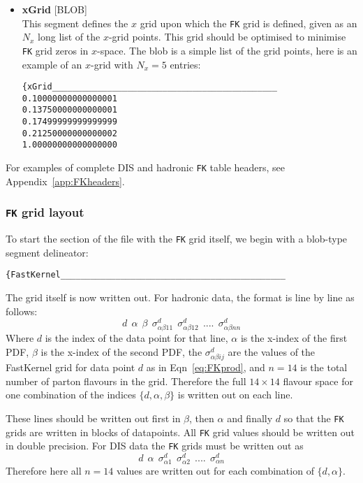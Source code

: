 \documentclass[11pt]{article}
\newcommand{\be}{\begin{equation}}
\newcommand{\ee}{\end{equation}}
\begin{document}
\begin{itemize}
\item \textbf{xGrid} [BLOB]\\
This segment defines the $x$ grid upon which the {\tt FK} grid is defined, given as an $N_x$ long list of the $x$-grid points. This grid should be optimised to minimise {\tt FK} grid zeros in $x$-space. The blob is a simple list of the grid points, here is an example of an $x$-grid with $N_x=5$ entries:
\begin{verbatim}
{xGrid_____________________________________________
0.10000000000000001     
0.13750000000000001     
0.17499999999999999     
0.21250000000000002     
1.00000000000000000     
\end{verbatim}
\end{itemize}

 For examples of complete DIS and hadronic {\tt FK} table headers, see Appendix~\ref{app:FKheaders}.



\subsubsection*{{\tt FK} grid layout}
To start the section of the file with the {\tt FK} grid itself, we begin with a blob-type segment delineator:
\begin{verbatim}
{FastKernel_____________________________________________
\end{verbatim}
The grid itself is now written out. For hadronic data, the format is line by line as follows:
\be d \:\: \alpha \:\: \beta \:\: \sigma^d_{\alpha\beta 1 1} \:\: \sigma^d_{\alpha\beta 1 2}\:\: ....\:\: \sigma^d_{\alpha\beta n n} \ee
Where $d$ is the index of the data point for that line, $\alpha$ is the x-index of the first PDF, $\beta$ is the x-index of the second PDF, the $\sigma^d_{\alpha\beta i j}$ are the values of the FastKernel grid for data point $d$ as in Eqn~\ref{eq:FKprod}, and $n=14$ is the total number of parton flavours in the grid. Therefore the full $14\times 14$ flavour space for one combination of the indices $\{d,\alpha,\beta\}$ is written out on each line. 

These lines should be written out first in $\beta$, then $\alpha$ and finally $d$ so that the {\tt FK} grids are written in blocks of datapoints. All {\tt FK} grid values should be written out in double precision. For DIS data the {\tt FK} grids must be written out as
\be d \:\: \alpha \:\: \sigma^d_{\alpha 1} \:\: \sigma^d_{\alpha 2}\:\: ....\:\: \sigma^d_{\alpha n} \ee
Therefore here all $n=14$ values are written out for each combination of $\{d,\alpha\}$.
\end{document}
